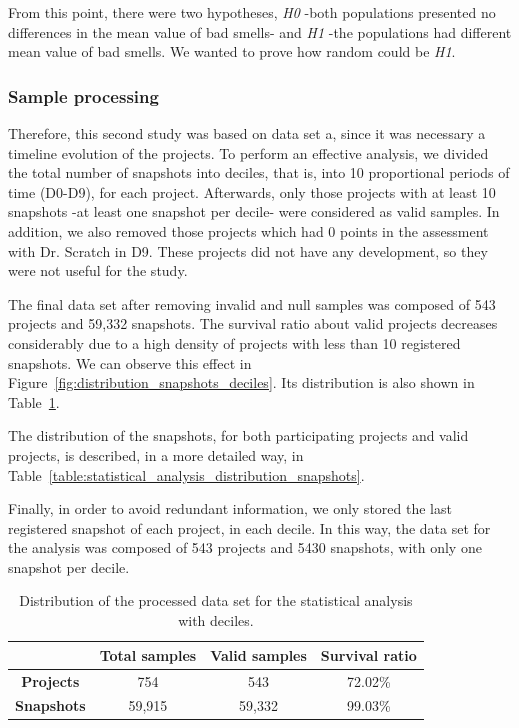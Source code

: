 From this point, there were two hypotheses, \textit{H0} -both populations presented no differences in the mean value of bad smells- and \textit{H1} -the populations had different mean value of bad smells. We wanted to prove how random could be \textit{H1}.   


\subsubsection{Sample processing}
\label{subsubsec:sample_processing}

Therefore, this second study was based on data set a, since it was necessary a timeline evolution of the projects. To perform an effective analysis, we divided the total number of snapshots into deciles, that is, into 10 proportional periods of time (D0-D9), for each project. Afterwards, only those projects with at least 10 snapshots -at least one snapshot per decile- were considered as valid samples. In addition, we also removed those projects which had 0 points in the assessment with Dr. Scratch in D9. These projects did not have any development, so they were not useful for the study. 

The final data set after removing invalid and null samples was composed of 543 projects and 59,332 snapshots. The survival ratio about valid projects decreases considerably due to a high density of projects with less than 10 registered snapshots. We can observe this effect in Figure~\ref{fig:distribution_snapshots_deciles}. Its distribution is also shown in Table~\ref{table:statistical_analysis_distribution_samples}. 

The distribution of the snapshots, for both participating projects and valid projects, is described, in a more detailed way, in Table~\ref{table:statistical_analysis_distribution_snapshots}.

Finally, in order to avoid redundant information, we only stored the last registered snapshot of each project, in each decile. In this way, the data set for the analysis was composed of 543 projects and 5430 snapshots, with only one snapshot per decile.


\begin{table}
    \centering
    \begin{tabular}{|c|c|c|c|}
        \hline
        & \textbf{Total samples} & \textbf{Valid samples} & \textbf{Survival ratio} \\ \hline
        \textbf{Projects} & 754 & 543 & 72.02\% \\ \hline
        \textbf{Snapshots} & 59,915 & 59,332 & 99.03\% \\ \hline
    \end{tabular}
    \caption{Distribution of the processed data set for the statistical analysis with deciles.}
    \label{table:statistical_analysis_distribution_samples}
\end{table}

